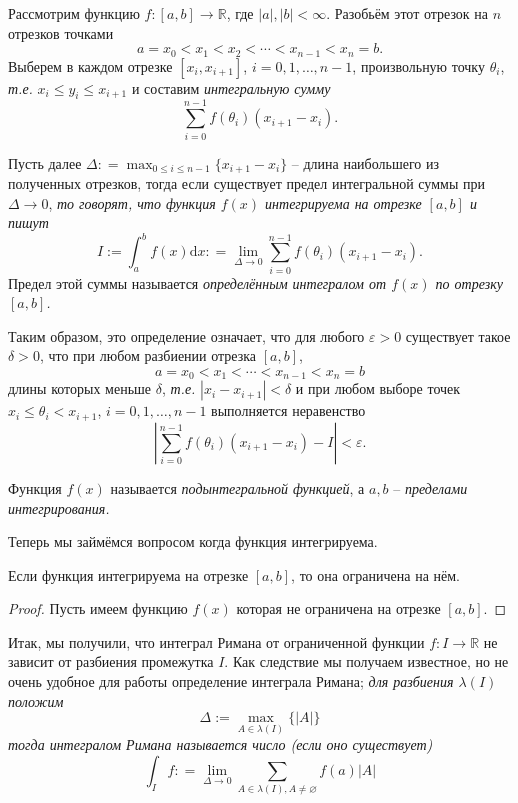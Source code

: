 
\newpage
\begin{definition}
    Рассмотрим функцию $f: [a, b] \to \mathbb{R}$, где $|a|, |b| < \infty$. Разобьём этот отрезок на $n$ отрезков точками
    \[
    a = x_0 < x_1 < x_2 < \cdots < x_{n-1} < x_n = b.
    \]
Выберем в каждом отрезке $[x_i, x_{i+1}]$, $i=0,1,\ldots, n-1$, произвольную точку $\theta_i$, \textit{т.е.} $x_i \le y_i \le x_{i+1}$ и составим \textit{интегральную сумму}
\[
 \sum_{i=0}^{n-1} f(\theta_i)(x_{i+1} - x_{i}).
\]

Пусть далее $\Delta: = \max_{0 \le i \le n-1} \{x_{i+1} -x_i\}$ -- длина наибольшего из полученных отрезков, тогда если существует предел интегральной суммы при $\Delta \to 0$, \textit{то говорят, что функция $f(x)$ интегрируема на отрезке $[a,b]$ и пишут}
\[
 I:=\int_a^b f(x) \mathrm{d}x : = \lim_{\Delta \to 0}  \sum_{i=0}^{n-1} f(\theta_i)(x_{i+1} - x_{i}).
 \]
Предел этой суммы называется \textit{определённым интегралом от $f(x)$ по отрезку $[a,b]$.}

Таким образом, это определение означает, что для любого $\varepsilon >0$ существует такое $\delta >0$, что при любом разбиении отрезка $[a,b]$, 
\[
 a = x_0 < x_1 < \cdots < x_{n-1} < x_n = b
\]
длины которых меньше $\delta$, \textit{т.е.} $|x_i - x_{i+1}|<\delta$ и при любом выборе точек $x_i \le \theta_i < x_{i+1}$, $i = 0,1,\ldots, n-1$ выполняется неравенство
\[
 \left| \sum_{i=0}^{n-1} f(\theta_i)(x_{i+1} - x_{i}) -I \right|< \varepsilon. 
\]

Функция $f(x)$ называется \textit{подынтегральной функцией}, а $a,b$ -- \textit{пределами интегрирования.}
\end{definition}

Теперь мы займёмся вопросом когда функция интегрируема.

\begin{lemma}
    Если функция интегрируема на отрезке $[a,b]$, то она ограничена на нём.
\end{lemma}
\begin{proof}
    Пусть имеем функцию $f(x)$ которая не ограничена на отрезке $[a,b]$.
\end{proof}





\begin{remark}
    Итак, мы получили, что интеграл Римана от ограниченной функции $f:I \to \mathbb{R}$ не зависит от разбиения промежутка $I$. Как следствие мы получаем известное, но не очень удобное для работы определение интеграла Римана; \textit{для разбиения $\lambda(I)$ положим 
    $$\Delta := \max_{A\in \lambda(I)}\{|A|\} $$
    тогда интегралом Римана называется число (если оно существует)
    \[
    \int_I f: = \lim_{\Delta\to 0} \sum_{A\in \lambda(I), A \ne \varnothing}f(a)|A|
    \]
    }
\end{remark}




